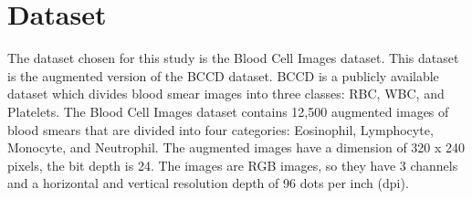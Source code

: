 \section{Dataset}

The dataset chosen for this study is the Blood Cell Images dataset.
This dataset is the augmented version of the BCCD 
dataset. BCCD is a publicly available dataset which divides blood smear images into three classes: RBC, WBC, and Platelets.
The Blood Cell Images dataset contains 12,500 augmented images of blood smears that are divided into four categories: Eosinophil, Lymphocyte, Monocyte, and Neutrophil.
The augmented images have a dimension of 320 x 240 pixels, the bit depth is 24. The images are RGB images, so they have 3 channels and a horizontal and vertical resolution depth of 96 dots per inch (dpi).
